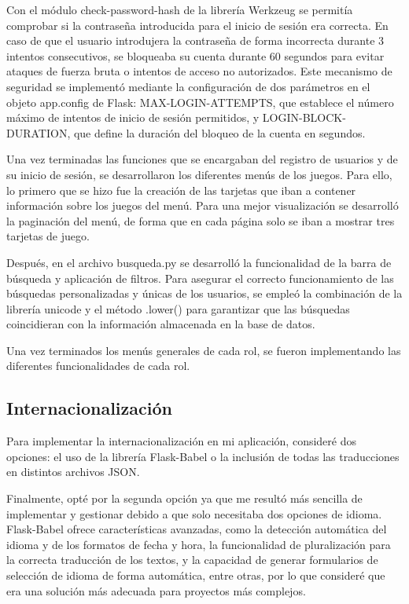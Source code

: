 Con el módulo check-password-hash de la librería Werkzeug se permitía comprobar si la contraseña introducida para el inicio de sesión era correcta. En caso de que el usuario introdujera la contraseña de forma incorrecta durante 3 intentos consecutivos, se bloqueaba su cuenta durante 60 segundos para evitar ataques de fuerza bruta o intentos de acceso no autorizados. Este mecanismo de seguridad se implementó mediante la configuración de dos parámetros en el objeto app.config de Flask: MAX-LOGIN-ATTEMPTS, que establece el número máximo de intentos de inicio de sesión permitidos, y LOGIN-BLOCK-DURATION, que define la duración del bloqueo de la cuenta en segundos.

Una vez terminadas las funciones que se encargaban del registro de usuarios y de su inicio de sesión, se desarrollaron los diferentes menús de los juegos. Para ello, lo primero que se hizo fue la creación de las tarjetas que iban a contener información sobre los juegos del menú. Para una mejor visualización se desarrolló la paginación del menú, de forma que en cada página solo se iban a mostrar tres tarjetas de juego.

Después, en el archivo busqueda.py se desarrolló la funcionalidad de la barra de búsqueda y aplicación de filtros. Para asegurar el correcto funcionamiento de las búsquedas personalizadas y únicas de los usuarios, se empleó la combinación de la librería unicode y el método .lower() para garantizar que las búsquedas coincidieran con la información almacenada en la base de datos.

Una vez terminados los menús generales de cada rol, se fueron implementando las diferentes funcionalidades de cada rol.

\subsection{Internacionalización}
Para implementar la internacionalización en mi aplicación, consideré dos opciones: el uso de la librería Flask-Babel o la inclusión de todas las traducciones en distintos archivos JSON.

Finalmente, opté por la segunda opción ya que me resultó más sencilla de implementar y gestionar debido a que solo necesitaba dos opciones de idioma. Flask-Babel ofrece características avanzadas, como la detección automática del idioma y de los formatos de fecha y hora, la funcionalidad de pluralización para la correcta traducción de los textos, y la capacidad de generar formularios de selección de idioma de forma automática, entre otras, por lo que consideré que era una solución más adecuada para proyectos más complejos.

